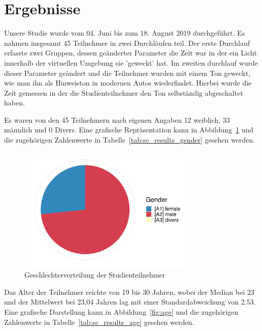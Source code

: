 \section{Ergebnisse}


Unsere Studie wurde vom 04. Juni bis zum 18. August 2019 durchgeführt. Es nahmen insgesamt 45 Teilnehmer in zwei Durchläufen teil. Der erste Durchlauf erfasste zwei Gruppen, dessen geänderter Parameter die Zeit war in der ein Licht innerhalb der virtuellen Umgebung sie 'geweckt' hat. Im zweiten durchlauf wurde dieser Parameter geändert und die Teilnehmer wurden mit einem Ton geweckt, wie man ihn als Hinweiston in modernen Autos wiederfindet. Hierbei wurde die Zeit gemessen in der die Studienteilnehmer den Ton selbständig abgeschaltet haben. 

Es waren von den 45 Teilnehmern nach eigenen Angaben 12 weiblich, 33 männlich und 0 Divers. Eine grafische Repräsentation kann in Abbildung~\ref{fig:gender} und die zugehörigen Zahlenwerte in Tabelle~\ref{tab:sc_results_gender} gesehen werden. 

\begin{figure}
	\includegraphics[width=0.75\textwidth]{./appendices/gender}
	\caption{Geschlechterverteilung der Studienteilnehmer}
	\label{fig:gender}
\end{figure}

Das Alter der Teilnehmer reichte von 19 bis 30 Jahren, wobei der Median bei 23 und der Mittelwert bei 23,04 Jahren lag mit einer Standardabweichung von 2.53. Eine grafische Darstellung kann in Abbildung~\ref{fig:age} und die zugehörigen Zahlenwerte in Tabelle~\ref{tab:sc_results_age} gesehen werden.

